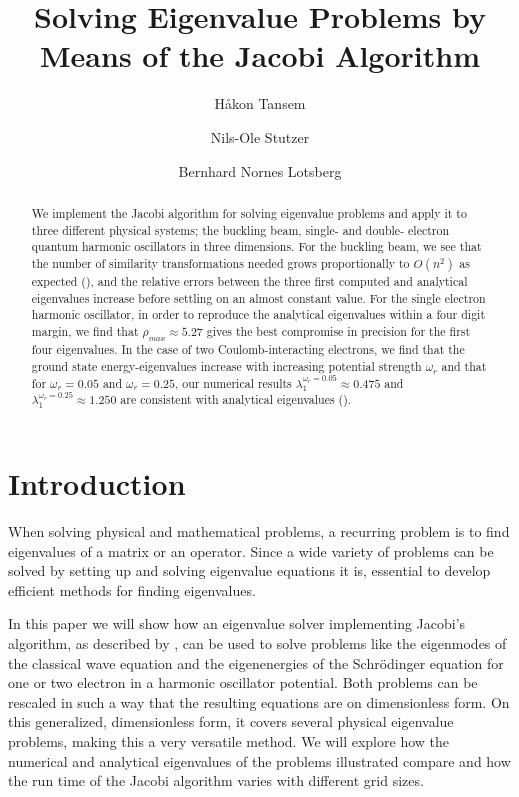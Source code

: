 \documentclass[twocolumn]{aastex62}
\begin{document}
\title{Solving Eigenvalue Problems by Means of the Jacobi Algorithm}

\author{Håkon Tansem}

\author{Nils-Ole Stutzer}

\author{Bernhard Nornes Lotsberg}

\begin{abstract}

We implement the Jacobi algorithm for solving eigenvalue problems and apply it to three different physical systems; the buckling beam, single- and double- electron quantum harmonic oscillators in three dimensions. For the buckling beam, we see that the number of similarity transformations needed grows proportionally to $O(n^2)$ as expected  (\cite{Jensen:2015}), and the relative errors between the three first computed and analytical eigenvalues increase before settling on an almost constant value. For the single electron harmonic oscillator, in order to reproduce the analytical eigenvalues within a four digit margin, we find that $\rho_{max}\approx 5.27$ gives the best compromise in precision for the first four eigenvalues. In the case of two Coulomb-interacting electrons, we find that the ground state energy-eigenvalues increase with increasing potential strength $\omega_r$ and that for $\omega_r=0.05$ and $\omega_r=0.25$, our numerical results $\lambda_1^{\omega_r=0.05}\approx 0.475$ and $\lambda_1^{\omega_r=0.25}\approx 1.250$ are consistent with analytical eigenvalues (\cite{taut:1993}).
\end{abstract}

\section{Introduction} \label{sec:intro}
When solving physical and mathematical problems, a recurring problem is to find eigenvalues of a matrix or an operator. Since a wide variety of problems can be solved by setting up and solving eigenvalue equations it is, essential to develop efficient methods for finding eigenvalues. 

In this paper we will show how an eigenvalue solver implementing Jacobi's algorithm, as described by \citep[Ch. 7.4]{Jensen:2015}, can be used to solve problems like the eigenmodes of the classical wave equation and the eigenenergies of the Schrödinger equation for one or two electron in a harmonic oscillator potential. Both problems can be rescaled in such a way that the resulting equations are on dimensionless form. On this generalized, dimensionless form, it covers several physical eigenvalue problems, making this a very versatile method. We will explore how the numerical and analytical eigenvalues of the problems illustrated compare and how the run time of the Jacobi algorithm varies with different grid sizes.
\end{document}
